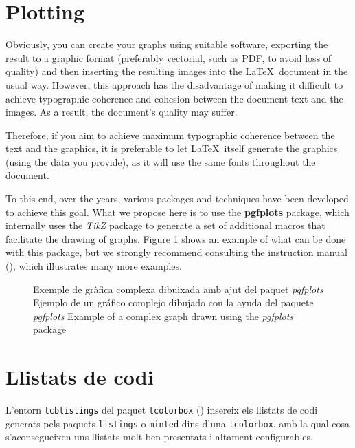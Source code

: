   \section{Plotting}
  
  Obviously, you can create your graphs using suitable software, exporting the result to a graphic format (preferably vectorial, such as PDF, to avoid loss of quality) and then inserting the resulting images into the \LaTeX\ document in the usual way. However, this approach has the disadvantage of making it difficult to achieve typographic coherence and cohesion between the document text and the images. As a result, the document's quality may suffer.
  
  Therefore, if you aim to achieve maximum typographic coherence between the text and the graphics, it is preferable to let \LaTeX\ itself generate the graphics (using the data you provide), as it will use the same fonts throughout the document.
  
  To this end, over the years, various packages and techniques have been developed to achieve this goal. What we propose here is to use the \textbf{pgfplots} package, which internally uses the \textit{TikZ} package to generate a set of additional macros that facilitate the drawing of graphs. Figure \ref{fig:plot} shows an example of what can be done with this package, but we strongly recommend consulting the instruction manual (\cite{pgfplots}), which illustrates many more examples.
\fi

\begin{figure}[ht]
  \centering
  
  \caption{\ifcase\doclanguage\or
     Exemple de gràfica complexa dibuixada amb ajut del paquet \emph{pgfplots}\or
     Ejemplo de un gráfico complejo dibujado con la ayuda del paquete \emph{pgfplots}\else
     Example of a complex graph drawn using the \emph{pgfplots} package\fi
  }\label{fig:plot}
\end{figure}

\ifcase\doclanguage\or
  \section{Llistats de codi}
  
  L'entorn \texttt{tcblistings} del paquet \texttt{tcolorbox} (\cite{tcolorbox}) insereix els llistats de codi generats pels paquets \texttt{listings} o \texttt{minted} dins d'una \texttt{tcolorbox}, amb la qual cosa s'aconsegueixen uns llistats molt ben presentats i altament configurables.
  
